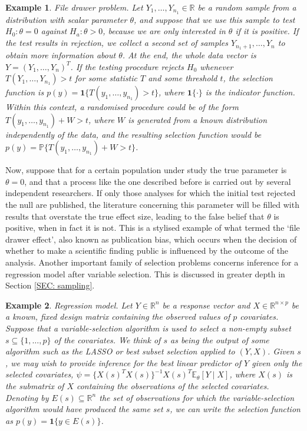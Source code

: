\documentclass[pdflatex,sn-chicago]{sn-jnl}%
\theoremstyle{thmstyleone}%
\theoremstyle{thmstyletwo}%
\newtheorem{example}{Example}%
\theoremstyle{thmstylethree}%
\begin{document}
\begin{example} \label{EX: file_drawer}
\textit{File drawer problem}. Let $Y_1, \ldots, Y_{n_1} \in \mathbb{R}$ be a random sample from a distribution with scalar parameter $\theta$, and suppose that we use this sample to test $H_0\colon \theta = 0$ against $H_a\colon \theta > 0$, because we are only interested in $\theta$ if it is positive. If the test results in rejection, we collect a second set of samples $Y_{n_1 + 1}, \ldots, Y_n$ to obtain more information about $\theta$. At the end, the whole data vector is $Y = (Y_1, \ldots, Y_n)^T$. If the testing procedure rejects $H_0$ whenever $T(Y_1, \ldots, Y_{n_1}) > t$ for some statistic $T$ and some threshold $t$, the selection function is $p(y) = \mathbf{1}\{ T(y_1, \ldots, y_{n_1}) > t \}$, where $\mathbf{1}\{\cdot \}$ is the indicator function. Within this context, a randomised procedure could be of the form $T(y_1, \ldots, y_{n_1}) + W > t$, where $W$ is generated from a known distribution independently of the data, and the resulting selection function would be $p(y) = \mathbb{P}\{ T(y_1, \ldots, y_{n_1}) + W > t \}$.
\end{example}

Now, suppose that for a certain population under study the true parameter is $\theta = 0$, and that a process like the one described before is carried out by several independent researchers. If only those analyses for which the initial test rejected the null are published, the literature concerning this parameter will be filled with results that overstate the true effect size, leading to the false belief that $\theta$ is positive, when in fact it is not. This is a stylised example of what \cite{rosenthal} termed the `file drawer effect', also known as publication bias, which occurs when the decision of whether to make a scientific finding public is influenced by the outcome of the analysis. Another important family of selection problems concerns inference for a regression model after variable selection. This is discussed in greater depth in Section \ref{SEC: sampling}.

\begin{example} \label{EX: regression}
\textit{Regression model}. Let $Y \in \mathbb{R}^n$ be a response vector and $X\in \mathbb{R}^{n\times p}$ be a known, fixed design matrix containing the observed values of $p$ covariates. Suppose that a variable-selection algorithm is used to select a non-empty subset $s\subseteq \{1, \ldots, p\}$ of the covariates. We think of $s$ as being the output of some algorithm such as the LASSO or best subset selection applied to $(Y, X)$. Given $s$, we may wish to provide inference for the best linear predictor of $Y$ given only the selected covariates, $\psi = \{X(s)^T X(s)\}^{-1} X(s)^T \mathbb{E}_\theta[Y\mid X]$, where $X(s)$ is the submatrix of $X$ containing the observations of the selected covariates. Denoting by $E(s)  \subseteq \mathbb{R}^n$ the set of observations for which the variable-selection algorithm would have produced the same set $s$, we can write the selection function as $p(y) = \mathbf{1}\{y\in E(s)\}$.
\end{example}
\end{document}
